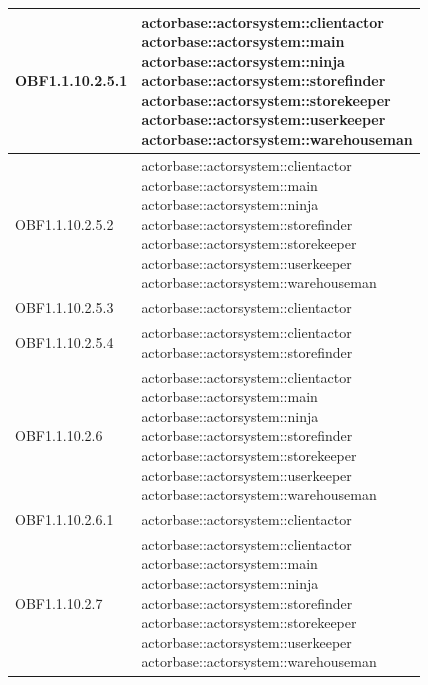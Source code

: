 \documentclass{scalatekids-article}
\begin{document}
\begin{longtable}[H]{|p{3.5cm}|p{7.5cm}|}
\hline
OBF1.1.10.2.5.1 & \multiLineCell[t]{actorbase::actorsystem::clientactor\\actorbase::actorsystem::main\\actorbase::actorsystem::ninja\\actorbase::actorsystem::storefinder\\actorbase::actorsystem::storekeeper\\actorbase::actorsystem::userkeeper\\actorbase::actorsystem::warehouseman\\}\\
\hline
OBF1.1.10.2.5.2 & \multiLineCell[t]{actorbase::actorsystem::clientactor\\actorbase::actorsystem::main\\actorbase::actorsystem::ninja\\actorbase::actorsystem::storefinder\\actorbase::actorsystem::storekeeper\\actorbase::actorsystem::userkeeper\\actorbase::actorsystem::warehouseman\\}\\
\hline
OBF1.1.10.2.5.3 & \multiLineCell[t]{actorbase::actorsystem::clientactor\\}\\
\hline
OBF1.1.10.2.5.4 & \multiLineCell[t]{actorbase::actorsystem::clientactor\\actorbase::actorsystem::storefinder\\}\\
\hline
OBF1.1.10.2.6 & \multiLineCell[t]{actorbase::actorsystem::clientactor\\actorbase::actorsystem::main\\actorbase::actorsystem::ninja\\actorbase::actorsystem::storefinder\\actorbase::actorsystem::storekeeper\\actorbase::actorsystem::userkeeper\\actorbase::actorsystem::warehouseman\\}\\
\hline
OBF1.1.10.2.6.1 & \multiLineCell[t]{actorbase::actorsystem::clientactor\\}\\
\hline
OBF1.1.10.2.7 & \multiLineCell[t]{actorbase::actorsystem::clientactor\\actorbase::actorsystem::main\\actorbase::actorsystem::ninja\\actorbase::actorsystem::storefinder\\actorbase::actorsystem::storekeeper\\actorbase::actorsystem::userkeeper\\actorbase::actorsystem::warehouseman\\}\\

\end{longtable}
\end{document}
